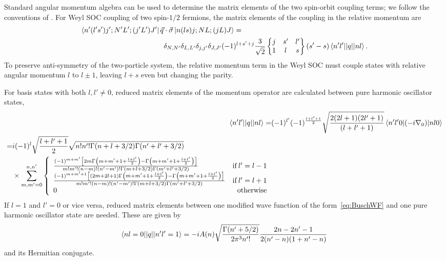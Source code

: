 \documentclass[%
 notitlepage,
 preprint,
showpacs,%
 amsmath,amssymb,
 aps,
pra,
]{revtex4-1}
\newcommand{\sixj}[6]{ \begin{Bmatrix}
  #1 & #2 & #3 \\
  #4 & #5 & #6 
 \end{Bmatrix}}
\begin{document}
Standard angular momentum algebra can be used to determine the matrix elements of the two spin-orbit coupling terms; we follow the conventions of \cite{Edmonds}. For Weyl SOC coupling of two spin-$1/2$ fermions, the matrix elements of the coupling in the relative momentum are
\begin{equation}\label{eq:WeylRel}\begin{split}
\bra{n'(l's')j';N'L';(j'L')J'}\vec{q}&\cdot\vec{\sigma} \ket{n(ls)j;NL;(jL)J} = \\
&\delta_{N,N'}\delta_{L,L'}\delta_{j,j'}\delta_{J,J'}(-1)^{l+s'+j}\frac{3}{\sqrt{2}}\sixj{j}{s'}{l'}{1}{l}{s} (s'-s)\braket{n'l' || q || n l}.
\end{split}
\end{equation}
To preserve anti-symmetry of the two-particle system, the relative momentum term in the Weyl SOC must couple states with relative angular momentum $l$ to $l\pm 1$, leaving $l+s$ even but changing the parity.

For basis states with both $l,l'\neq0$, reduced matrix elements of the momentum operator are calculated between pure harmonic oscillator states,
\begin{align}
\braket{n'l' || q || n l}=&(-1)^{l'}(-1)^{\frac{l+l'+1}{2}}\sqrt{\frac{2(2l+1)(2l'+1)}{(l+l'+1)}}\braket{n'l'0| (-i \nabla_0) | n l 0} \\
\begin{split} =& i(-1)^{l}\sqrt{\frac{l+l'+1}{2}}\sqrt{n!n'!\Gamma(n+l+3/2)\Gamma(n'+l'+3/2)} \\ 
&\times\sum_{m,m'=0}^{n,n'} \left\{
     \begin{array}{lr}
       \frac{(-1)^{m+m'}\left[2m\Gamma\left(m+m'+1+\frac{l+l'}{2}\right)-\Gamma\left(m+m'+1+\frac{l+l'}{2}\right)\right]}{m!m'!(n-m)!(n'-m')!\Gamma(m+l+3/2)\Gamma(m'+l'+3/2)} & \text{if}\: l'=l-1 \\
        \frac{(-1)^{m+m'+1}\left[(2m+2l+1)\Gamma\left(m+m'+1+\frac{l+l'}{2}\right)-\Gamma\left(m+m'+1+\frac{l+l'}{2}\right)\right]}{m!m'!(n-m)!(n'-m')!\Gamma(m+l+3/2)\Gamma(m'+l'+3/2)} & \text{if}\: l'=l+1 \\
       0 & \text{otherwise}
     \end{array}
   \right.
   \end{split}
\end{align}
If $l=1$ and $l'=0$ or vice versa, reduced matrix elements between one modified wave function of the form~\eqref{eq:BuschWF} and one pure harmonic oscillator state are needed. These are given by
\begin{align}
\braket{n l=0 || q || n' l'=1}=-i A(n) \sqrt{\frac{\Gamma(n'+5/2)}{2\pi^3 n'!}}\frac{2n-2n'-1}{2(n'-n)(1+n'-n)}
\end{align}
and its Hermitian conjugate.
\end{document}
